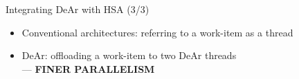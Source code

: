 \documentclass{beamer}
\begin{document}
\begin{CJK}{UTF8}{bkai}
            \begin{frame}{Integrating DeAr with HSA (3/3)}
                \begin{itemize}
                    \item <2-> {Conventional architectures: referring to a work-item as a thread}
                    \item <3-> {DeAr: offloading a work-item to two DeAr threads\\ --- \textbf{FINER PARALLELISM}}
                \end{itemize}
                \begin{figure}[!ht]
                    \begin{center}
                        \setcounter{subfigure}{0}
                        \hfill
                    \end{center}
                \end{figure}
            \end{frame}


\end{CJK}
\end{document}
